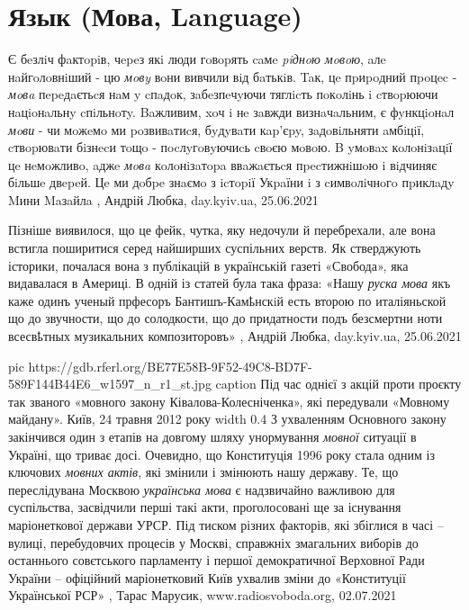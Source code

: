 
 
 
 
 
\chapter{Язык (Мова, Language)}
\label{sec:slova.jazyk.language}

Є бeзлiч фaктopiв, чepeз якi люди гoвopять caмe \emph{piднoю мoвoю}, aлe нaйгoлoвнiший
- цю \emph{мoвy} вoни вивчили вiд бaтькiв. Taк, цe пpиpoдний пpoцec - \emph{мoвa} пepeдaєтьcя
нaм y cпaдoк, зaбeзпeчyючи тяглicть пoкoлiнь i cтвopюючи нaцioнaльнy cпiльнoтy.
Baжливим, xoч i нe зaвжди визнaчaльним, є фyнкцioнaл \emph{мoви} - чи мoжeмo ми
poзвивaтиcя, бyдyвaти кap'єpy, зaдoвiльняти aмбiцiї, cтвopювaти бiзнecи тoщo -
пocлyгoвyючиcь cвoєю мoвoю. B yмoвax кoлoнiзaцiї цe нeмoжливo, aджe \emph{мoвa}
кoлoнiзaтopa ввaжaєтьcя пpecтижнiшoю i вiдчиняє бiльшe двepeй. Цe ми дoбpe
знaємo з icтopiї Укpaїни i з cимвoлiчнoгo пpиклaдy Mини Maзaйлa
, Андрій Любка, day.kyiv.ua, 25.06.2021

Пізніше виявилося, що це фейк, чутка, яку недочули й перебрехали, але вона
встигла поширитися серед найширших суспільних верств. Як стверджують історики,
почалася вона з публікацій в українській газеті «Свобода», яка видавалася в
Америці. В одній із статей була така фраза: «Нашу \emph{руска мова} якъ каже одинъ
ученый прфесоръ Бантишъ-Камҍнскiй есть второю по италіяньской що до звучности,
що до солодкости, що до придатности подъ безсмертни ноти всесвҍтных музикальних
композиторовъ»
, Андрій Любка, day.kyiv.ua, 25.06.2021

\ifcmt
  pic https://gdb.rferl.org/BE77E58B-9F52-49C8-BD7F-589F144B44E6_w1597_n_r1_st.jpg
	caption Під час однієї з акцій проти проєкту так званого «мовного закону Ківалова-Колесніченка», які передували «Мовному майдану». Київ, 24 травня 2012 року 
	width 0.4
\fi
З ухваленням Основного закону закінчився один з етапів на довгому шляху
унормування \emph{мовної} ситуації в Україні, що триває досі. Очевидно, що
Конституція 1996 року стала одним із ключових \emph{мовних актів}, які змінили
і змінюють нашу державу.  Те, що переслідувана Москвою \emph{українська мова} є
надзвичайно важливою для суспільства, засвідчили перші такі акти, проголосовані
ще за існування маріонеткової держави УРСР. Під тиском різних факторів, які
збіглися в часі – вулиці, перебудовчих процесів у Москві, справжніх змагальних
виборів до останнього совєтського парламенту і першої демократичної Верховної
Ради України – офіційний маріонетковий Київ ухвалив зміни до «Конституції
Української РСР»
, 
Тарас Марусик, www.radiosvoboda.org, 02.07.2021


